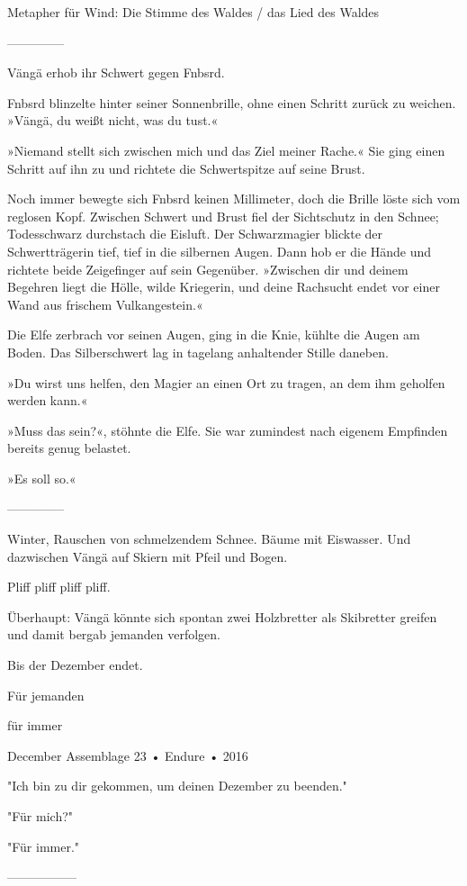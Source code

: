 Metapher für Wind: Die Stimme des Waldes / das Lied des Waldes

--------------

Vängä erhob ihr Schwert gegen Fnbsrd.

Fnbsrd blinzelte hinter seiner Sonnenbrille, ohne einen Schritt zurück zu weichen. »Vängä, du weißt nicht, was du tust.«

»Niemand stellt sich zwischen mich und das Ziel meiner Rache.« Sie ging einen Schritt auf ihn zu und richtete die Schwertspitze auf seine Brust.

Noch immer bewegte sich Fnbsrd keinen Millimeter, doch die Brille löste sich vom reglosen Kopf. Zwischen Schwert und Brust fiel der Sichtschutz in den Schnee; Todesschwarz durchstach die Eisluft. Der Schwarzmagier blickte der Schwertträgerin tief, tief in die silbernen Augen. Dann hob er die Hände und richtete beide Zeigefinger auf sein Gegenüber. »Zwischen dir und deinem Begehren liegt die Hölle, wilde Kriegerin, und deine Rachsucht endet vor einer Wand aus frischem Vulkangestein.«

Die Elfe zerbrach vor seinen Augen, ging in die Knie, kühlte die Augen am Boden. Das Silberschwert lag in tagelang anhaltender Stille daneben.

»Du wirst uns helfen, den Magier an einen Ort zu tragen, an dem ihm geholfen werden kann.«

»Muss das sein?«, stöhnte die Elfe. Sie war zumindest nach eigenem Empfinden bereits genug belastet.

»Es soll so.«

--------------



Winter, Rauschen von schmelzendem Schnee. Bäume mit Eiswasser.
Und dazwischen Vängä auf Skiern mit Pfeil und Bogen.

Pliff pliff pliff pliff.

Überhaupt: Vängä könnte sich spontan zwei Holzbretter als Skibretter greifen und damit bergab jemanden verfolgen.

Bis der Dezember endet.

Für jemanden

für immer

December
Assemblage 23
 •
Endure
 •
2016


"Ich bin zu dir gekommen, um deinen Dezember zu beenden."

"Für mich?"

"Für immer."

-----------------


















